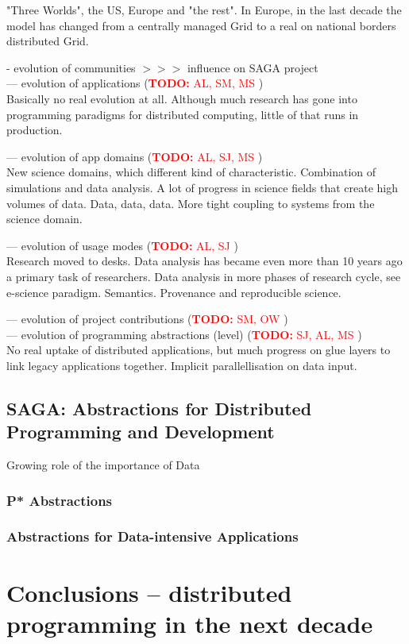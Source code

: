 \documentclass{article}
\newcommand{\B}[1]{\textbf{#1}}
\newcommand{\nind}{\noindent}
\newcommand{\todo}[1]{{\textcolor{red}{\B{TODO:} #1 }}}
\begin{document}
"Three Worlds", the US, Europe and "the rest".
In Europe, in the last decade the model has changed from a centrally managed Grid to a real on national borders distributed Grid.

 
 \nind
 - evolution of communities  $>>>$ influence on SAGA project\\
 --- evolution of applications (\todo{AL, SM, MS})\\
 
Basically no real evolution at all. Although much research has gone into programming paradigms for distributed computing, little of that runs in production.
 
 --- evolution of app domains (\todo{AL, SJ, MS})\\
 
 New science domains, which different kind of characteristic.
 Combination of simulations and data analysis. A lot of progress in science fields that create high volumes of data.
Data, data, data.
More tight coupling to systems from the science domain.
 
 --- evolution of usage modes (\todo{AL, SJ})\\
 
 Research moved to desks. Data analysis has became even more than 10 years ago a primary task of researchers.
 Data analysis in more phases of research cycle, see e-science paradigm.
Semantics.
Provenance and reproducible science.
  
 --- evolution of project contributions (\todo{SM, OW})\\
 
 --- evolution of programming abstractions (level) (\todo{SJ, AL, MS})\\
 
No real uptake of distributed applications, but much progress on glue layers to link legacy applications together.
Implicit parallellisation on data input.


\subsection{SAGA: Abstractions for Distributed Programming and
  Development}

Growing role of the importance of Data


\subsubsection{P* Abstractions}

\subsubsection{Abstractions for Data-intensive Applications}


\section{Conclusions -- distributed programming in the next decade}







\footnotesize


\end{document}
